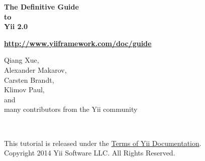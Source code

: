 \documentclass[a4paper,11pt,twoside]{book}
\title{\plainTitle}
\author{\plainAuthors}
\newcommand{\formattedTitle}{The Definitive Guide\\\vspace{.5cm}to\\\vspace{.5cm}Yii 2.0}
\newcommand{\formattedAuthors}{
    Qiang Xue,\\
    Alexander Makarov,\\
    Carsten Brandt,\\
    Klimov Paul,\\
    and\\
    many contributors from the Yii community
}
\newcommand{\formattedTranslators}{}
\begin{document}
    \frontmatter

    \begin{titlepage}
        \setlength{\oddsidemargin}{-1in}
        \setlength{\evensidemargin}{-1in}
        \setlength{\textwidth}{\paperwidth}

        \vspace*{\fill}

        \noindent
        \parbox{\textwidth}{\centering \bfseries \Huge
            \formattedTitle
        }

        \vfill

        \noindent
        \parbox{\textwidth}{\centering \bfseries
            \url{http://www.yiiframework.com/doc/guide}
        }

        \vfill

        \noindent
        \parbox{\textwidth}{\centering \Large
            \formattedAuthors
            \\ \vspace{1cm}
            \formattedTranslators
        }

        \vspace*{\fill}

        \noindent
        \parbox{\textwidth}{\centering
            This tutorial is released under the \href{http://www.yiiframework.com/doc/terms/}{Terms of Yii Documentation}.\\
            \vspace{0.5cm}
            Copyright 2014 Yii Software LLC. All Rights Reserved.
        }
    \end{titlepage}

    \pagebreak \thispagestyle{empty} \cleardoublepage

    \setcounter{tocdepth}{1}
    \tableofcontents

    \mainmatter

	
\end{document}

